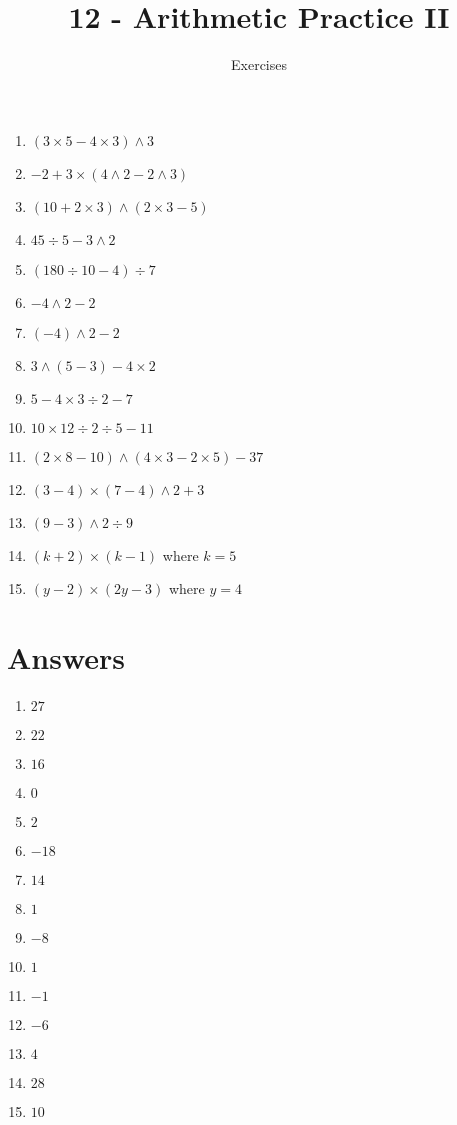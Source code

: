\documentclass[11pt]{article}
\title{12 - Arithmetic Practice II}
\author{Exercises}
\begin{document}
\maketitle
\begin{enumerate}
	\item $(3 \times 5 - 4 \times 3)\wedge 3$
	\item $-2+3\times\left(4\wedge 2 - 2\wedge 3\right)$
	\item $(10+2\times 3)\wedge (2\times 3 - 5)$
	\item $45 \div 5 - 3 \wedge 2$
	\item $\left(180 \div 10 -4\right) \div 7$
	\item $-4\wedge 2 - 2$
	\item $(-4) \wedge 2 - 2$
	\item $3 \wedge (5-3) - 4 \times 2$
	\item $5-4\times 3 \div 2 - 7$
	\item $10 \times 12 \div 2 \div 5 - 11$
	\item $(2 \times 8 - 10)\wedge (4\times 3 - 2 \times 5) - 37$
	
	\item $(3 - 4) \times (7-4)\wedge 2 + 3$
	\item $(9-3)\wedge 2\div 9$
	
	\item $(k+2)\times (k-1)$ where $k=5$
	\item $(y - 2) \times (2y - 3)$ where $y=4$
\end{enumerate}


\newpage
\section*{Answers}
\begin{enumerate}
	\item $27$
	\item $22$
	\item $16$
	\item $0$
	\item $2$
	\item $-18$
	\item $14$
	\item $1$
	\item $-8$
	\item $1$
	\item $-1$
	
	\item $-6$
	\item $4$
	
	\item $28$
	\item $10$
	
\end{enumerate}
\end{document}
